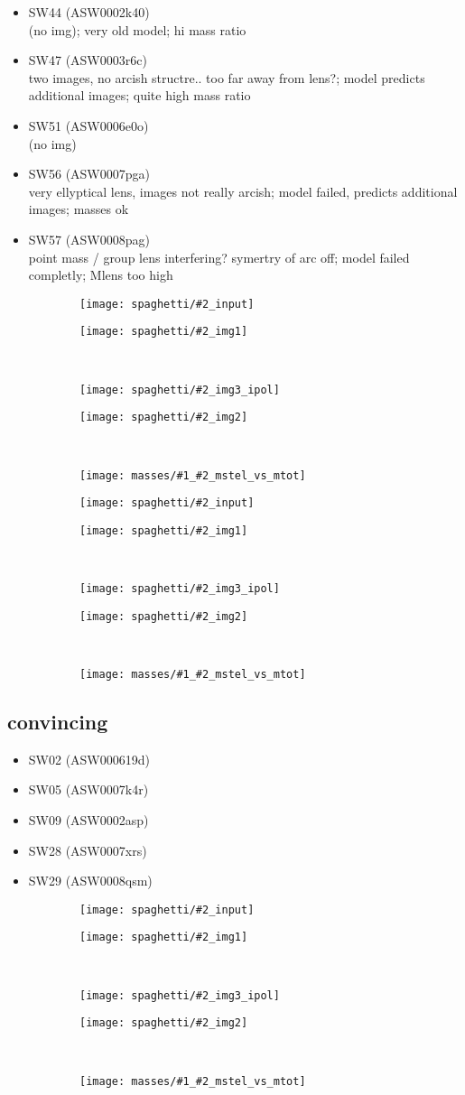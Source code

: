 \documentclass[fleqn,usenatbib]{mnras}
\newcommand{\inclfig}[2]{
  \centering
  \begin{subfigure}{0.5\linewidth}
    \texttt{[image: spaghetti/\#2\_input]}
  \end{subfigure}%
  \begin{subfigure}{0.5\linewidth}
    \texttt{[image: spaghetti/\#2\_img1]}
  \end{subfigure}%
  \\[-1px]%
  \begin{subfigure}{0.5\linewidth}
    \texttt{[image: spaghetti/\#2\_img3\_ipol]}
  \end{subfigure}%
  \begin{subfigure}{0.5\linewidth}
    \texttt{[image: spaghetti/\#2\_img2]}
  \end{subfigure}%
  \\[-1px]%
  \begin{subfigure}[b]{\linewidth}
    \texttt{[image: masses/\#1\_\#2\_mstel\_vs\_mtot]}
  \end{subfigure}
}
\begin{document}
\begin{itemize}
  \item SW44 (ASW0002k40) \\
  (no img);
  very old model;
  hi mass ratio
  
  \item SW47 (ASW0003r6c) \\
  two images, no arcish structre.. too far away from lens?;
  model predicts additional images;
  quite high mass ratio
  
  \item SW51 (ASW0006e0o) \\
  (no img)
  
  \item SW56 (ASW0007pga) \\
  very ellyptical lens, images not really arcish;
  model failed, predicts additional images;
  masses ok
  
  \item SW57 (ASW0008pag) \\
  point mass / group lens interfering? symertry of arc off;
  model failed completly;
  Mlens too high
  
\end{itemize}


\begin{figure}
	\inclfig{SW19}{ASW0001ld7_OS3CYAKLRT}
\end{figure}


\begin{figure}
	\inclfig{SW57}{ASW0008pag_5SXGXQYY6V}
\end{figure}



\subsection{convincing}
\begin{itemize}
  \item SW02 (ASW000619d)
  
    
  \item SW05 (ASW0007k4r)
  
  \item SW09 (ASW0002asp)
  
  \item SW28 (ASW0007xrs)
  
  \item SW29 (ASW0008qsm)
  
\end{itemize}

\begin{figure}
	\inclfig{SW02}{ASW000619d_011489}
\end{figure}
\end{document}

